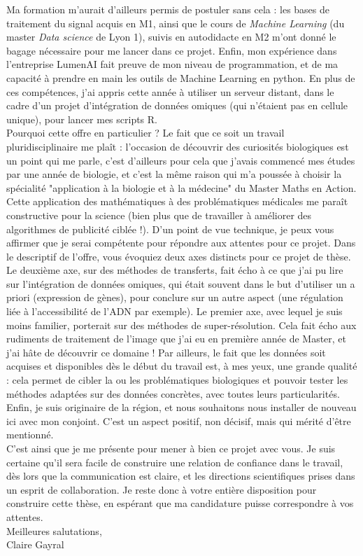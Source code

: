 \documentclass[a4paper,12pt]{article}
\begin{document}
%
Ma formation m'aurait d'ailleurs permis de postuler sans cela : les bases de traitement du signal acquis en M1, ainsi que le cours de \textit{Machine Learning} (du master \textit{Data science} de Lyon 1), suivis en autodidacte en M2 m'ont donné le bagage nécessaire pour me lancer dans ce projet. Enfin, mon expérience dans l'entreprise LumenAI fait preuve de mon niveau de programmation, et de ma capacité à prendre en main les outils de Machine Learning en python. En plus de ces compétences, j'ai appris cette année à utiliser un serveur distant, dans le cadre d'un projet d'intégration de données omiques (qui n'étaient pas en cellule unique), pour lancer mes scripts R. \\
%

Pourquoi cette offre en particulier ? Le fait que ce soit un travail pluridisciplinaire me plaît : l'occasion de découvrir des curiosités biologiques est un point qui me parle, c'est d'ailleurs pour cela que j'avais commencé mes études par une année de biologie, et c'est la même raison qui m'a poussée à choisir la spécialité "application à la biologie et à la médecine" du Master Maths en Action. Cette application des mathématiques à des problématiques médicales me paraît constructive pour la science (bien plus que de travailler à améliorer des algorithmes de publicité ciblée !). 
D'un point de vue technique, je peux vous affirmer que je serai compétente pour répondre aux attentes pour ce projet. Dans le descriptif de l'offre, vous évoquiez deux axes distincts pour ce projet de thèse. Le deuxième axe, sur des méthodes de transferts, fait écho à ce que j'ai pu lire sur l'intégration de données omiques, qui était souvent dans le but d'utiliser un a priori (expression de gènes), pour conclure sur un autre aspect (une régulation liée à l'accessibilité de l'ADN par exemple). Le premier axe, avec lequel je suis moins familier, porterait sur des méthodes de super-résolution. Cela fait écho aux rudiments de traitement de l'image que j'ai eu en première année de Master, et j'ai hâte de découvrir ce domaine ! %
%
Par ailleurs, le fait que les données soit acquises et disponibles dès le début du travail est, à mes yeux, une grande qualité : cela permet de cibler la ou les problématiques biologiques et pouvoir tester les méthodes adaptées sur des données concrètes, avec toutes leurs particularités. Enfin, je suis originaire de la région, et nous souhaitons nous installer de nouveau ici avec mon conjoint. C'est un aspect positif, non décisif, mais qui mérité d'être mentionné. 
\\
%

C'est ainsi que je me présente pour mener à bien ce projet avec vous. Je suis certaine qu'il sera facile de construire une relation de confiance dans le travail, dès lors que la communication est claire, et les directions scientifiques prises dans un esprit de collaboration. Je reste donc à votre entière disposition pour construire cette thèse, en espérant que ma candidature puisse correspondre à vos attentes. \\

Meilleures salutations, \\

Claire Gayral
\end{document}
